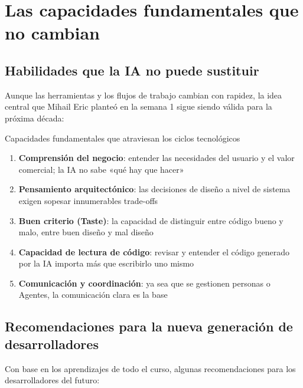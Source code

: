 \documentclass[a4paper]{article}
\begin{document}
\section{Las capacidades fundamentales que no cambian}

\subsection{Habilidades que la IA no puede sustituir}

Aunque las herramientas y los flujos de trabajo cambian con rapidez, la idea central que Mihail Eric planteó en la semana 1 sigue siendo válida para la próxima década:

\begin{importantbox}{Capacidades fundamentales que atraviesan los ciclos tecnológicos}
\begin{enumerate}
    \item \textbf{Comprensión del negocio}: entender las necesidades del usuario y el valor comercial; la IA no sabe «qué hay que hacer»
    \item \textbf{Pensamiento arquitectónico}: las decisiones de diseño a nivel de sistema exigen sopesar innumerables trade-offs
    \item \textbf{Buen criterio (Taste)}: la capacidad de distinguir entre código bueno y malo, entre buen diseño y mal diseño
    \item \textbf{Capacidad de lectura de código}: revisar y entender el código generado por la IA importa más que escribirlo uno mismo
    \item \textbf{Comunicación y coordinación}: ya sea que se gestionen personas o Agentes, la comunicación clara es la base
\end{enumerate}
\end{importantbox}

\subsection{Recomendaciones para la nueva generación de desarrolladores}

Con base en los aprendizajes de todo el curso, algunas recomendaciones para los desarrolladores del futuro:
\end{document}
